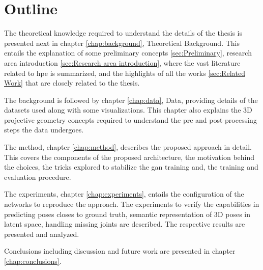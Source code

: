 \section{Outline}
\label{sec:outline}
The theoretical knowledge required to understand the details of the thesis is presented next in chapter \ref{chap:background}, Theoretical Background. This entails the explanation of some preliminary concepts \ref{sec:Preliminary}, research area introduction \ref{sec:Research area introduction}, where the vast literature related to \ac{hpe} is summarized, and the highlights of all the works \ref{sec:Related Work} that are closely related to the thesis.

The background is followed by chapter \ref{chap:data}, Data,  providing details of the datasets used along with some visualizations. This chapter also explains the 3D projective geometry concepts required to understand the pre and post-processing steps the data undergoes.

The method, chapter \ref{chap:method}, describes the proposed approach in detail. This covers the components of the proposed architecture, the motivation behind the choices, the tricks explored to stabilize the \ac{gan} training and, the training and evaluation procedure.

The experiments, chapter \ref{chap:experiments}, entails the configuration of the networks to reproduce the approach. The experiments to verify the capabilities in predicting poses closes to ground truth, semantic representation of 3D poses in latent space, handling missing joints are described. The respective results are presented and analyzed.  

Conclusions including discussion and future work are presented in chapter \ref{chap:conclusions}.


